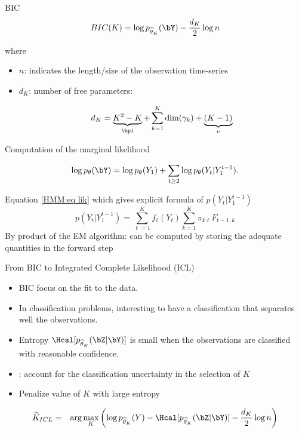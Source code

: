 \documentclass[compress,10pt]{beamer}
\begin{document}
\begin{frame}{BIC}
$$
BIC(K) = \log p_{\widehat{\theta}_K}(\bY) - \frac{d_K}2 \log n$$

where
\begin{itemize}
 \item $n$:  indicates the length/size of the observation time-series
\item $d_K$: number of free parameters:

$$d_K = \underbrace{K^2 - K}_{\bpi} + \sum_{k=1}^K \text{dim}(\gamma_k) + \underbrace{(K-1)}_{\nu}$$
\end{itemize}

\end{frame}





\begin{frame}{Computation of the marginal likelihood}
\label{HMM: eq:marg like} 

$$
 \log p_{\theta}(\bY) = \log p_{\theta}(Y_1) + \sum_{t \geq 2} \log p_{\theta}(Y_t | Y_1^{t-1}).
 $$
 
 
Equation \eqref{HMM:eq lik} which gives explicit formula of $p(Y_t | Y_1^{t-1})$
$$
p(Y_t | Y_1^{t-1}) =   \sum_{\ell=1}^K{f_{\ell}(Y_t)  \sum_{k=1}^K \pi_{k \ell} F_{t-1, k}}                                                         $$
By product of the EM algorithm: can be computed by storing the adequate quantities in  the forward step
 
\end{frame}

\begin{frame}{From BIC to Integrated Complete Likelihood (ICL)}
\begin{itemize}
\item BIC focus on the fit to the data. 
\item In classification problems, interesting to have a classification that separates well the observations.  
\item Entropy $\Hcal[p_{\widehat{\theta}_K}(\bZ | \bY)]$  is small when the observations are classified with reasonable confidence.
\item \cite{biernacki2000}: account for the classification uncertainty in the selection of $K$
\item Penalize value of $K$ with large entropy
\end{itemize}

\begin{definition}[ICL]
\begin{eqnarray*}
  \widehat{K}_{ICL} &=& \arg\max_K \left(\log p_{\widehat{\theta}_K}(Y) - \Hcal[p_{\widehat{\theta}_K}(\bZ | \bY)]- \frac{d_K}2 \log n\right)
\end{eqnarray*}
\end{definition}

\end{frame}
\end{document}

